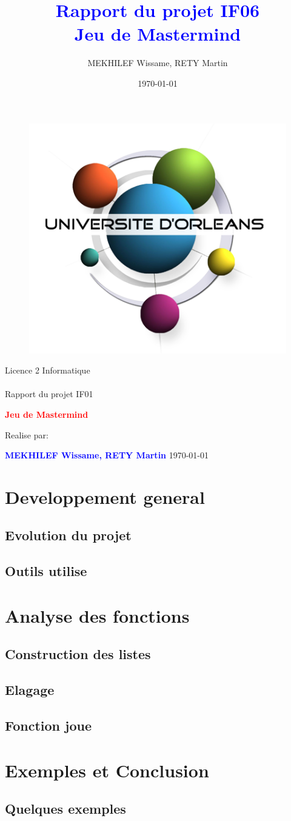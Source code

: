 \documentclass[a4paper,twoside,12pt]{report}
\title{\textcolor{blue}{\Large Rapport du projet IF06}\\\textcolor{blue}{\Large Jeu de Mastermind}}
\author{MEKHILEF Wissame, RETY Martin \date{\today}}
\newcommand{\moncode}[1]{\begin{center}
                        
                        \end{center}}
\begin{document}
\thispagestyle{empty}
%
\begin{figure}[H]
\includegraphics[width=0.2\linewidth]{Logo-univ-orleans.png}

\end{figure}
\vspace{2cm}
%
\begin{center}
{\Huge Licence 2 Informatique\\\ \\Rapport du projet IF01}
\par\vspace{1.4cm}

{\Huge\bf \textcolor{red}{\bf Jeu de Mastermind}}
\par\vspace{1.6cm}

{\Large Realise par:}
\par\vspace{1.3cm}
{\large\bf \textcolor{blue}{MEKHILEF Wissame, RETY Martin}}
\vfill
\today
\end{center}
\newpage
\pagestyle{fancy}

\begin{abstract}
%
\end{abstract}
 
\newpage
\tableofcontents
\listoffigures
\newpage

\chapter{Developpement general}
% 
\section{Evolution du projet}
% 
\section{Outils utilise}
% 
\chapter{Analyse des fonctions}
%
\moncode{listCouleur.mli}
%
\section{Construction des listes}
%
\section{Elagage}
%
\section{Fonction joue}
%
\moncode{mastermind.mli}
%
\chapter{Exemples et Conclusion}
%
\section{Quelques exemples}
\end{document}
